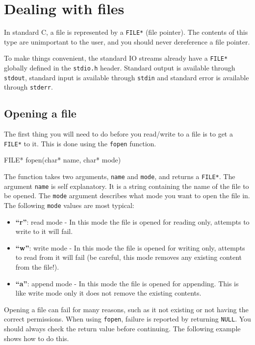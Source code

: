 \chapter{Dealing with files}

In standard C, a file is represented by a \texttt{FILE*} (file pointer).
The contents of this type are unimportant to the user, and you should never dereference a file pointer.

To make things convenient, the standard IO streams already have a \texttt{FILE*} globally defined in the \texttt{stdio.h} header.
Standard output is available through \texttt{stdout}, standard input is available through \texttt{stdin} and standard error is available through \texttt{stderr}.

\section{Opening a file}

The first thing you will need to do before you read/write to a file is to get a \texttt{FILE*} to it.
This is done using the \texttt{fopen} function.

\begin{codeinline}
FILE* fopen(char* name, char* mode)
\end{codeinline}

The function takes two arguments, \texttt{name} and \texttt{mode}, and returns a \texttt{FILE*}.
The argument \texttt{name} is self explanatory. It is a string containing the name of the file to be opened.
The \texttt{mode} argument describes what mode you want to open the file in.
The following \texttt{mode} values are most typical:

\begin{itemize}
  \item{\textbf{``r''}:} read mode - In this mode the file is opened for reading only, attempts to write to it will fail.
  \item{\textbf{``w''}:} write mode - In this mode the file is opened for writing only, attempts to read from it will fail (be careful, this mode removes any existing content from the file!).
  \item{\textbf{``a''}:} append mode - In this mode the file is opened for appending. This is like write mode only it does not remove the existing contents.
\end{itemize}

Opening a file can fail for many reasons, such as it not existing or not having the correct permissions.
When using \texttt{fopen}, failure is reported by returning \texttt{NULL}.
You should always check the return value before continuing.
The following example shows how to do this.

